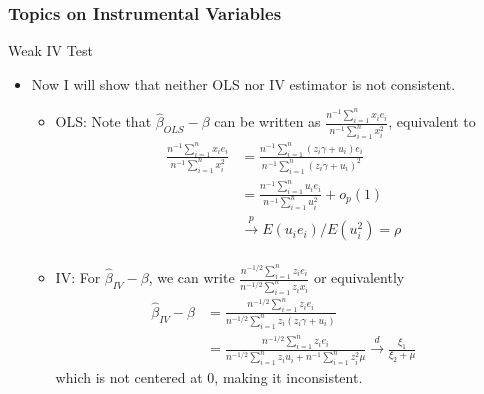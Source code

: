 \documentclass{beamer}
\begin{document}
\begin{frame}
\frametitle{Topics on Instrumental Variables}
Weak IV Test
\begin{itemize}
\item Now I will show that neither OLS nor IV estimator is not consistent. 
\begin{itemize}
\item OLS: Note that $\hat{\beta}_{OLS}-\beta$ can be written as $\frac{n^{-1}\sum_{i=1}^n x_ie_i}{n^{-1}\sum_{i=1}^nx_i^2}$, equivalent to
\footnotesize{\[
\begin{aligned}
\frac{n^{-1}\sum_{i=1}^n x_ie_i}{n^{-1}\sum_{i=1}^nx_i^2}&=\frac{n^{-1}\sum_{i=1}^n (z_i\gamma+u_i)e_i}{n^{-1}\sum_{i=1}^n(z_i\gamma+u_i)^2}\\
&=\frac{n^{-1}\sum_{i=1}^n u_ie_i}{n^{-1}\sum_{i=1}^nu_i^2}+o_p(1)\\
&\xrightarrow{p}E(u_ie_i)/E(u_i^2)=\rho\\
\end{aligned}
\]}\normalsize
\item IV: For $\hat{\beta}_{IV}-\beta$, we can write $\frac{n^{-1/2}\sum_{i=1}^n z_ie_i}{n^{-1/2}\sum_{i=1}^nz_ix_i}$ or equivalently
\footnotesize{\[
\begin{aligned}
\hat{\beta}_{IV}-\beta&=\frac{n^{-1/2}\sum_{i=1}^n z_ie_i}{n^{-1/2}\sum_{i=1}^nz_i(z_i\gamma+u_i)}\\
&=\frac{n^{-1/2}\sum_{i=1}^n z_ie_i}{n^{-1/2}\sum_{i=1}^nz_iu_i+n^{-1}\sum_{i=1}^n z_i^2\mu}\xrightarrow{d}\frac{\xi_1}{\xi_2+\mu}
\end{aligned}
\]}\normalsize
which is not centered at 0, making it inconsistent. 
\end{itemize}
\end{itemize}
\end{frame}


\end{document}
